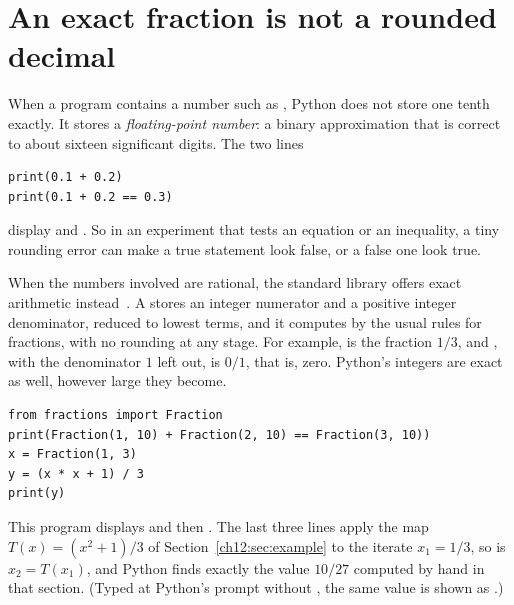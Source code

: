 \section{An exact fraction is not a rounded decimal}\label{appD:sec:fractions}
When a program contains a number such as , Python does not store one tenth exactly. It stores a \emph{floating-point number}: a binary approximation that is correct to about sixteen significant digits. The two lines
\par\noindent\begin{minipage}{\linewidth}
\begin{lstlisting}
print(0.1 + 0.2)
print(0.1 + 0.2 == 0.3)
\end{lstlisting}
\end{minipage}\par
display  and . So in an experiment that tests an equation or an inequality, a tiny rounding error can make a true statement look false, or a false one look true.

When the numbers involved are rational, the standard library offers exact arithmetic instead~\cite{pyfractions}. A  stores an integer numerator and a positive integer denominator, reduced to lowest terms, and it computes by the usual rules for fractions, with no rounding at any stage. For example,  is the fraction $1/3$, and , with the denominator $1$ left out, is $0/1$, that is, zero. Python's integers are exact as well, however large they become.
\par\noindent\begin{minipage}{\linewidth}
\begin{lstlisting}
from fractions import Fraction
print(Fraction(1, 10) + Fraction(2, 10) == Fraction(3, 10))
x = Fraction(1, 3)
y = (x * x + 1) / 3
print(y)
\end{lstlisting}
\end{minipage}\par
This program displays  and then . The last three lines apply the map $T(x)=(x^2+1)/3$ of Section~\ref{ch12:sec:example} to the iterate $x_1=1/3$, so  is $x_2=T(x_1)$, and Python finds exactly the value $10/27$ computed by hand in that section. (Typed at Python's prompt without , the same value is shown as .)

